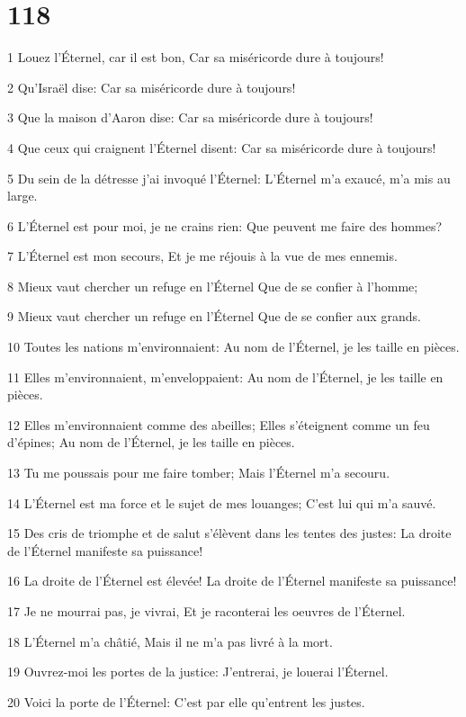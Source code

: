 \chapter{118}

\par 1 Louez l'Éternel, car il est bon, Car sa miséricorde dure à toujours!
\par 2 Qu'Israël dise: Car sa miséricorde dure à toujours!
\par 3 Que la maison d'Aaron dise: Car sa miséricorde dure à toujours!
\par 4 Que ceux qui craignent l'Éternel disent: Car sa miséricorde dure à toujours!
\par 5 Du sein de la détresse j'ai invoqué l'Éternel: L'Éternel m'a exaucé, m'a mis au large.
\par 6 L'Éternel est pour moi, je ne crains rien: Que peuvent me faire des hommes?
\par 7 L'Éternel est mon secours, Et je me réjouis à la vue de mes ennemis.
\par 8 Mieux vaut chercher un refuge en l'Éternel Que de se confier à l'homme;
\par 9 Mieux vaut chercher un refuge en l'Éternel Que de se confier aux grands.
\par 10 Toutes les nations m'environnaient: Au nom de l'Éternel, je les taille en pièces.
\par 11 Elles m'environnaient, m'enveloppaient: Au nom de l'Éternel, je les taille en pièces.
\par 12 Elles m'environnaient comme des abeilles; Elles s'éteignent comme un feu d'épines; Au nom de l'Éternel, je les taille en pièces.
\par 13 Tu me poussais pour me faire tomber; Mais l'Éternel m'a secouru.
\par 14 L'Éternel est ma force et le sujet de mes louanges; C'est lui qui m'a sauvé.
\par 15 Des cris de triomphe et de salut s'élèvent dans les tentes des justes: La droite de l'Éternel manifeste sa puissance!
\par 16 La droite de l'Éternel est élevée! La droite de l'Éternel manifeste sa puissance!
\par 17 Je ne mourrai pas, je vivrai, Et je raconterai les oeuvres de l'Éternel.
\par 18 L'Éternel m'a châtié, Mais il ne m'a pas livré à la mort.
\par 19 Ouvrez-moi les portes de la justice: J'entrerai, je louerai l'Éternel.
\par 20 Voici la porte de l'Éternel: C'est par elle qu'entrent les justes.
